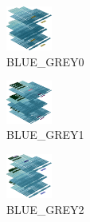 \hspace{0.1cm}
\begin{minipage}[b]{0.15\linewidth}
\begin{figure}[H]                                                          
  \centering                                                             
  \begin{adjustbox}{width=1.5cm,center}                                   
  \includegraphics[width=1.5cm]{src/colorspace_colourflow/flows/colourflow_166-45.png}%
  \end{adjustbox}                                                        
\caption*{BLUE\_GREY0}                                           
\end{figure}                                                               
\end{minipage}
\hspace{0.1cm}
\begin{minipage}[b]{0.15\linewidth}
\begin{figure}[H]                                                          
  \centering                                                             
  \begin{adjustbox}{width=1.5cm,center}                                   
  \includegraphics[width=1.5cm]{src/colorspace_colourflow/flows/colourflow_167-45.png}%
  \end{adjustbox}                                                        
\caption*{BLUE\_GREY1}                                           
\end{figure}                                                               
\end{minipage}
\hspace{0.1cm}
\begin{minipage}[b]{0.15\linewidth}
\begin{figure}[H]                                                          
  \centering                                                             
  \begin{adjustbox}{width=1.5cm,center}                                   
  \includegraphics[width=1.5cm]{src/colorspace_colourflow/flows/colourflow_168-45.png}%
  \end{adjustbox}                                                        
\caption*{BLUE\_GREY2}                                           
\end{figure}                                                               
\end{minipage}
